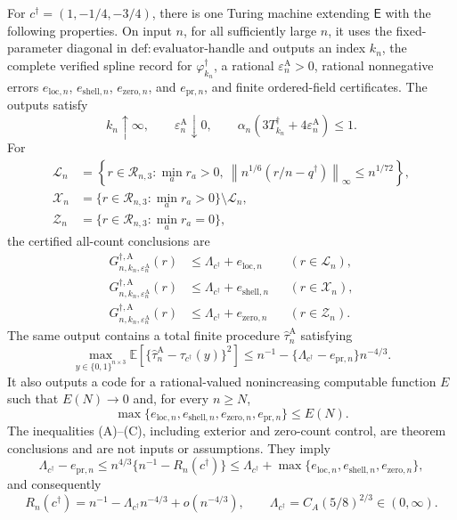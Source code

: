 For \(c^\dagger=(1,-1/4,-3/4)\), there is one Turing machine extending \(\mathsf E\) with the following properties.  On input \(n\), for all sufficiently large \(n\), it uses the fixed-parameter diagonal in
\(\mathrm{def:evaluator\text{-}handle}\) and outputs an index \(k_n\), the complete verified spline record for \(\varphi_{k_n}^\dagger\), a rational
\(\varepsilon_n^{\mathrm A}>0\), rational nonnegative errors
\(e_{\mathrm{loc},n}\), \(e_{\mathrm{shell},n}\),
\(e_{\mathrm{zero},n}\), and \(e_{\mathrm{pr},n}\), and finite ordered-field certificates.  The outputs satisfy
\[
k_n\uparrow\infty,
\qquad \varepsilon_n^{\mathrm A}\downarrow0,
\qquad
\alpha_n(3T_{k_n}^\dagger+4\varepsilon_n^{\mathrm A})\le1.
\]
For
\[
\begin{aligned}
\mathcal L_n&=\left\{r\in\mathcal R_{n,3}:\min_a r_a>0,
\ \left\|n^{1/6}(r/n-q^\dagger)\right\|_\infty
\le n^{1/72}\right\},\\
\mathcal X_n&=\{r\in\mathcal R_{n,3}:\min_a r_a>0\}
\setminus\mathcal L_n,\\
\mathcal Z_n&=\{r\in\mathcal R_{n,3}:\min_a r_a=0\},
\end{aligned}
\]
the certified all-count conclusions are
\[
\begin{aligned}
G_{n,k_n,\varepsilon_n^{\mathrm A}}^{\dagger,\mathrm A}(r)
&\le\Lambda_{c^\dagger}+e_{\mathrm{loc},n}
&& (r\in\mathcal L_n),\\
G_{n,k_n,\varepsilon_n^{\mathrm A}}^{\dagger,\mathrm A}(r)
&\le\Lambda_{c^\dagger}+e_{\mathrm{shell},n}
&& (r\in\mathcal X_n),\\
G_{n,k_n,\varepsilon_n^{\mathrm A}}^{\dagger,\mathrm A}(r)
&\le\Lambda_{c^\dagger}+e_{\mathrm{zero},n}
&& (r\in\mathcal Z_n).
\end{aligned}
\tag{A}
\]
The same output contains a total finite procedure \(\widehat\tau_n^{\mathrm A}\) satisfying
\[
\max_{y\in\{0,1\}^{n\times3}}
\mathbb E\left[\{\widehat\tau_n^{\mathrm A}-
\tau_{c^\dagger}(y)\}^2\right]
\le n^{-1}-\{\Lambda_{c^\dagger}-e_{\mathrm{pr},n}\}n^{-4/3}.
\tag{B}
\]
It also outputs a code for a rational-valued nonincreasing computable function
\(E\) such that \(E(N)\to0\) and, for every \(n\ge N\),
\[
\max\{e_{\mathrm{loc},n},e_{\mathrm{shell},n},
e_{\mathrm{zero},n},e_{\mathrm{pr},n}\}\le E(N).
\tag{C}
\]
The inequalities (A)--(C), including exterior and zero-count control, are theorem conclusions and are not inputs or assumptions.  They imply
\[
\Lambda_{c^\dagger}-e_{\mathrm{pr},n}
\le n^{4/3}\{n^{-1}-R_n(c^\dagger)\}
\le\Lambda_{c^\dagger}+
\max\{e_{\mathrm{loc},n},e_{\mathrm{shell},n},
e_{\mathrm{zero},n}\},
\]
and consequently
\[
R_n(c^\dagger)=n^{-1}-\Lambda_{c^\dagger}n^{-4/3}
+o(n^{-4/3}),
\qquad
\Lambda_{c^\dagger}=C_A(5/8)^{2/3}\in(0,\infty).
\]

